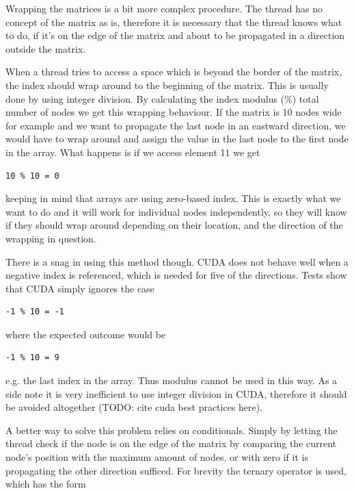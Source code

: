 Wrapping the matrices is a bit more complex procedure. The thread has no concept of the matrix as is, therefore it is necessary that the thread knows what to do, if it's on the edge of the matrix and about to be propagated in a direction outside the matrix.

When a thread tries to access a space which is beyond the border of the matrix, the index should wrap around to the beginning of the matrix. This is usually done by using integer division. By calculating the index modulus (\%) total number of nodes we get this wrapping behaviour. If the matrix is 10 nodes wide for example and we want to propagate the last node in an eastward direction, we would have to wrap around and assign the value in the last node to the first node in the array. What happens is if we access element 11 we get

\begin{verbatim}
10 % 10 = 0
\end{verbatim}

keeping in mind that arrays are using zero-based index. This is exactly what we want to do and it will work for individual nodes independently, so they will know if they should wrap around depending on their location, and the direction of the wrapping in question. 

There is a snag in using this method though. CUDA does not behave well when a negative index is referenced, which is needed for five of the directions. Tests show that CUDA simply ignores the case

\begin{verbatim}
-1 % 10 = -1
\end{verbatim}

where the expected outcome would be

\begin{verbatim}
-1 % 10 = 9
\end{verbatim}

e.g. the last index in the array. Thus modulus cannot be used in this way. As a side note it is very inefficient to use integer division in CUDA, therefore it should be avoided altogether (TODO: cite cuda best practices here).

A better way to solve this problem relies on conditionals. Simply by letting the thread check if the node is on the edge of the matrix by comparing the current node's position with the maximum amount of nodes, or with zero if it is propagating the other direction sufficed. For brevity the ternary operator is used, which has the form

